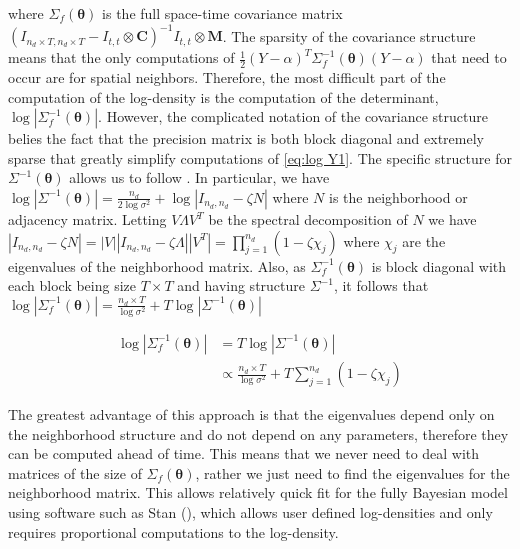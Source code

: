 \documentclass[11pt]{isuthesis}
\begin{document}
where $\Sigma_f(\boldsymbol{\theta})$ is the full space-time covariance matrix $\left(I_{n_d \times T,n_d \times T}-I_{t,t}\otimes \boldsymbol{C}\right)^{-1}I_{t,t}\otimes \boldsymbol{M}$.   The sparsity of the covariance structure means that the only computations of $\frac{1}{2}(Y-\alpha)^T\Sigma_f^{-1}(\boldsymbol{\theta})(Y-\alpha)$ that need to occur are for spatial neighbors. Therefore, the most difficult part of the computation of the log-density is the computation of the determinant, $\log | \Sigma_f^{-1}(\boldsymbol{\theta})|$.  However, the complicated notation of the covariance structure belies the fact that the precision matrix is both block diagonal and extremely sparse that greatly simplify computations of \eqref{eq:log Y1}.  The specific structure for $\Sigma^{-1}(\boldsymbol{\theta})$ allows us to follow \cite{jin2005generalized}.  In particular, we have $\log|\Sigma^{-1}(\boldsymbol{\theta})|=\frac{n_d}{2\log\sigma^2}+\log|I_{n_d,n_d}-\zeta N|$ where $N$ is the neighborhood or adjacency matrix.  Letting $V \Lambda V^T$ be the spectral decomposition of $N$ we have $|I_{n_d,n_d}-\zeta N|=|V| |I_{n_d,n_d}-\zeta \Lambda| |V^T|=\prod_{j=1}^{n_d}\left(1-\zeta \chi_j\right)$ where $\chi_j$ are the eigenvalues of the neighborhood matrix.  Also, as $ \Sigma_f^{-1}(\boldsymbol{\theta})$ is block diagonal with each block being size $T \times T$ and having structure $\Sigma^{-1}$, it follows that $\log| \Sigma_f^{-1}(\boldsymbol{\theta})|=\frac{n_d \times T}{\log\sigma^2}+T\log| \Sigma^{-1}(\boldsymbol{\theta})|$

\begin{align}
	\log | \Sigma_f^{-1}(\boldsymbol{\theta})|&  = T \log | \Sigma^{-1}(\boldsymbol{\theta})|\\
	& \propto \frac{n_d \times T}{\log\sigma^2}+ T \sum_{j=1}^{n_d}(1-\zeta\chi_j) \label{eq:eig}
\end{align}

The greatest advantage of this approach is that the eigenvalues depend only on the neighborhood structure and do not depend on any parameters, therefore they can be computed ahead of time.  This means that we never need to deal with matrices of the size of  $\Sigma_f(\boldsymbol{\theta})$, rather we just need to find the eigenvalues for the neighborhood matrix.  This allows relatively quick fit for the fully Bayesian model using software such as Stan (\cite{carpenter2016stan}), which allows user defined log-densities and only requires proportional computations to the log-density. 
\end{document}
